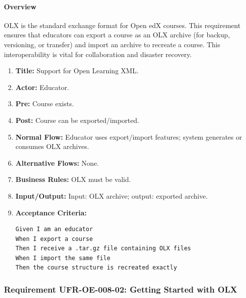 \paragraph{Overview}
OLX is the standard exchange format for Open edX courses. This requirement ensures that educators can export a course as an OLX archive (for backup, versioning, or transfer) and import an archive to recreate a course. This interoperability is vital for collaboration and disaster recovery.
\begin{enumerate}[label=\textbf{\arabic*.}]
\item \textbf{Title:} Support for Open Learning XML.
\item \textbf{Actor:} Educator.
\item \textbf{Pre:} Course exists.
\item \textbf{Post:} Course can be exported/imported.
\item \textbf{Normal Flow:} Educator uses export/import features; system generates or consumes OLX archives.
\item \textbf{Alternative Flows:} None.
\item \textbf{Business Rules:} OLX must be valid.
\item \textbf{Input/Output:} Input: OLX archive; output: exported archive.
\item \textbf{Acceptance Criteria:}
    \begin{verbatim}
Given I am an educator
When I export a course
Then I receive a .tar.gz file containing OLX files
When I import the same file
Then the course structure is recreated exactly
    \end{verbatim}
\end{enumerate}

\subsubsection{Requirement UFR-OE-008-02: Getting Started with OLX}
